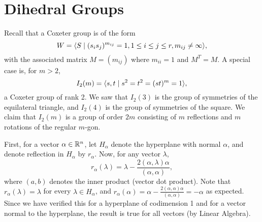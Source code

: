 \section{Dihedral Groups}
Recall that a Coxeter group is of the form
\[
    W = \langle S \mid (s_i s_j)^{m_{ij}} = 1,
    1 \leq i \leq j \leq r, m_{ij} \neq \infty \rangle,
\]
with the associated matrix $M = (m_{ij})$ where $m_{ii} = 1$ and $M^T = M$.
A special case is, for $m > 2$,
\[
    I_2(m) = \langle s, t \mid s^2 = t^2 = (st)^m = 1 \rangle,
\]
a Coxeter group of rank 2. We saw that
$I_2(3)$ is the group of symmetries of the equilateral triangle, and
$I_2(4)$ is the group of symmetries of the square.
We claim that $I_2(m)$ is a group of order $2m$ consisting of $m$
reflections and $m$ rotations of the regular $m$-gon.


First, for a vector $\alpha \in \mathbb{R}^n$, let $H_\alpha$ denote the hyperplane with
normal $\alpha$, and denote reflection in $H_\alpha$ by $r_\alpha$. Now, for
any vector $\lambda$,
\begin{equation} \label{eq:reflection}
    r_\alpha(\lambda) = \lambda - \frac{2(\alpha,\lambda) \alpha}{(\alpha,\alpha)},
\end{equation}
where $(a, b)$ denotes the inner product (vector dot product). Note that
$r_\alpha(\lambda) = \lambda$ for every $\lambda \in H_\alpha$, and
$r_\alpha(\alpha) = \alpha - \frac{2(\alpha,\alpha)\alpha}{(\alpha,\alpha)}
= -\alpha$ as expected. Since we have verified this for a hyperplane of
codimension 1 and for a vector normal to the hyperplane, the result is true for
all vectors (by Linear Algebra).

